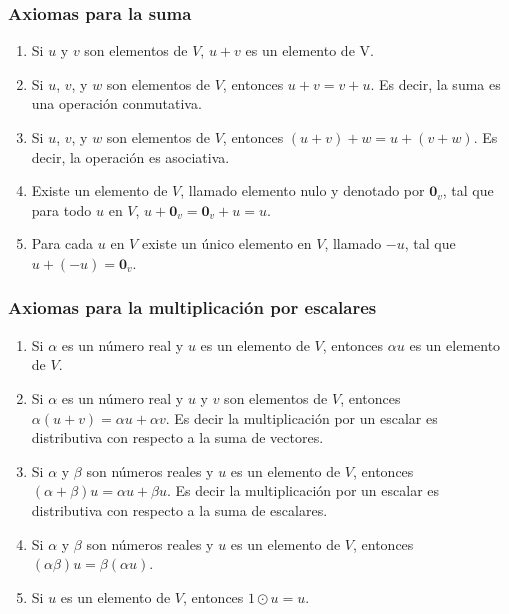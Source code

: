 \subsubsection*{Axiomas para la suma}
\begin{enumerate}
\item Si $u$ y $v$ son elementos de $V$, $u+v$ es un elemento de V.
\item Si $u$, $v$, y $w$ son elementos de $V$, entonces $u+v=v+u$. Es decir, la suma es una operación conmutativa.
\item Si $u$, $v$, y $w$ son elementos de $V$, entonces  $(u+v)+w=u+(v+w)$. Es decir, la operación es asociativa.
\item Existe un elemento de $V$, llamado elemento nulo y denotado por $\mathbf{0}_v$, tal que para todo $u$ en $V$, $u + \mathbf{0}_v = \mathbf{0}_v +u = u$.
\item Para cada $u$ en $V$ existe un único elemento en $V$, llamado $-u$, tal que $u+(-u)=\mathbf{0}_v$.
\end{enumerate}

\subsubsection*{Axiomas para la multiplicación por escalares}
\begin{enumerate}
\item Si $\alpha$ es un número real y $u$ es un elemento de $V$, entonces $\alpha u$ es un elemento de $V$.
\item Si $\alpha$ es un número real y $u$ y $v$ son elementos de $V$, entonces $\alpha (u+v) = \alpha u + \alpha v$. Es decir la multiplicación por un escalar es distributiva con respecto a la suma de vectores.
\item Si $\alpha$ y $\beta$ son números reales y $u$ es un elemento de $V$, entonces $(\alpha + \beta)u = \alpha u + \beta u$. Es decir la multiplicación por un escalar es distributiva con respecto a la suma de escalares.
\item Si $\alpha$ y $\beta$ son números reales y $u$ es un elemento de $V$, entonces $(\alpha \beta)u = \beta(\alpha u)$.
\item Si $u$ es un elemento de $V$, entonces $1 \odot u = u$.

\end{enumerate}

